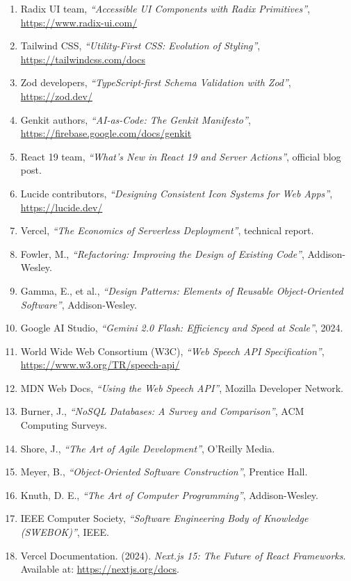 \begin{enumerate}
    \item[14] Radix UI team, \textit{``Accessible UI Components with Radix Primitives''}, \url{https://www.radix-ui.com/}
    \item[15] Tailwind CSS, \textit{``Utility-First CSS: Evolution of Styling''}, \url{https://tailwindcss.com/docs}
    \item[16] Zod developers, \textit{``TypeScript-first Schema Validation with Zod''}, \url{https://zod.dev/}
    \item[17] Genkit authors, \textit{``AI-as-Code: The Genkit Manifesto''}, \url{https://firebase.google.com/docs/genkit}
    \item[18] React 19 team, \textit{``What's New in React 19 and Server Actions''}, official blog post.
    \item[19] Lucide contributors, \textit{``Designing Consistent Icon Systems for Web Apps''}, \url{https://lucide.dev/}
    \item[20] Vercel, \textit{``The Economics of Serverless Deployment''}, technical report.
    \item[21] Fowler, M., \textit{``Refactoring: Improving the Design of Existing Code''}, Addison-Wesley.
    \item[22] Gamma, E., et al., \textit{``Design Patterns: Elements of Reusable Object-Oriented Software''}, Addison-Wesley.
    \item[23] Google AI Studio, \textit{``Gemini 2.0 Flash: Efficiency and Speed at Scale''}, 2024.
    \item[24] World Wide Web Consortium (W3C), \textit{``Web Speech API Specification''}, \url{https://www.w3.org/TR/speech-api/}
    \item[25] MDN Web Docs, \textit{``Using the Web Speech API''}, Mozilla Developer Network.
    \item[26] Burner, J., \textit{``NoSQL Databases: A Survey and Comparison''}, ACM Computing Surveys.
    \item[27] Shore, J., \textit{``The Art of Agile Development''}, O'Reilly Media.
    \item[28] Meyer, B., \textit{``Object-Oriented Software Construction''}, Prentice Hall.
    \item[29] Knuth, D. E., \textit{``The Art of Computer Programming''}, Addison-Wesley.
    \item[30] IEEE Computer Society, \textit{``Software Engineering Body of Knowledge (SWEBOK)''}, IEEE.
    \item[31] Vercel Documentation. (2024). \textit{Next.js 15: The Future of React Frameworks}. Available at: \url{https://nextjs.org/docs}.

\end{enumerate}
